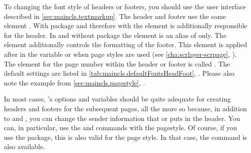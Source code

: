 \BeginIndexGroup%
%
%
%
%
%
To changing the font style of headers or footers, you should use the user
interface described in \autoref{sec:maincls.textmarkup}. The header and footer
use the same element
.
With package \hyperref[cha:scrlayer-scrpage]{}%
 and therefore with  the
 element is
additionally responsible for the header. In  and without
package  the element is an alias of
 only.
The
 element additionally
controls the formatting of the footer. This element is applied after
 in the
 variable or
when  page styles are
used (see \autoref{cha:scrlayer-scrpage},
). The element for the page
number within the header or footer is called
. The default
settings are listed in \autoref{tab:maincls.defaultFontsHeadFoot},
. Please also note the example
from \autoref{sec:maincls.pagestyle}, .
%
\EndIndexGroup
%
\EndIndexGroup


\begin{Declaration}
\end{Declaration}
In most cases, \KOMAScript{}'s options and variables should be quite adequate
for creating headers and footers for the
subsequent pages, all the more so because, in addition to  and
, you can change the sender information that 
or  puts in the header. You can, in particular, use the
 and 
commands with the %
 pagestyle. Of course, if you use the
\hyperref[cha:scrlayer-scrpage]{}%
%
package, this is also valid for the
 page style. In that case, the
 command is also
available.

